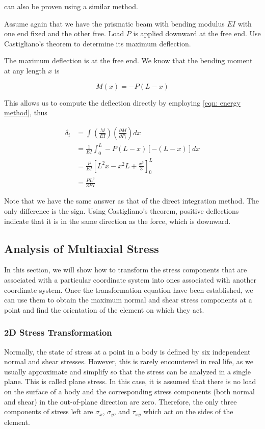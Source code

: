 \documentclass[a4paper,openany,nobib]{tufte-book}
\begin{document}
\begin{enumerate}
can also be proven using a similar method.

Assume again that we have the prismatic beam with bending modulus \(EI\)
with one end fixed and the other free. Load \(P\) is applied downward at
the free end. Use Castigliano's theorem to determine its maximum
deflection.

The maximum deflection is at the free end. We know that the bending
moment at any length \(x\) is

$$M(x) =  - P(L - x)$$

This allows us to compute the deflection directly by employing \ref{eqn: energy method}, thus

$$\begin{aligned}
  \delta_i &= \int \left( \frac{M}{EI} \right) \left( \frac{\partial M}{\partial P_i} \right)dx \\ 
              &= \frac{1}{EI}\int_0^L  - P(L - x)[ - (L - x)]dx  \\ 
              &= \frac{P}{EI}\left[ L^2x - x^2L + \frac{x^3}{3} \right]_0^L \\ 
              &= \frac{PL^3}{3EI} \end{aligned}$$

Note that we have the same answer as that of the direct integration
method. The only difference is the sign. Using Castigliano's theorem,
positive deflections indicate that it is in the same direction as the
force, which is downward.
\end{enumerate}

\subsection{Analysis of Multiaxial Stress}
\label{section: multiaxial stress}
In this section, we will show how to transform the stress components
that are associated with a particular coordinate system into ones
associated with another coordinate system. Once the transformation
equation have been established, we can use them to obtain the maximum
normal and shear stress components at a point and find the orientation
of the element on which they act.

\subsubsection{2D Stress Transformation}
\label{d-stress-transformation}
Normally, the state of stress at a point in a body is defined by six
independent normal and shear stresses. However, this is rarely
encountered in real life, as we usually approximate and simplify so that
the stress can be analyzed in a single plane. This is called plane
stress. In this case, it is assumed that there is no load on the surface
of a body and the corresponding stress components (both normal and
shear) in the out-of-plane direction are zero. Therefore, the only three
components of stress left are \(\sigma_x\), \(\sigma_y\), and \(\tau_{xy}\)
which act on the sides of the element.
\end{document}
